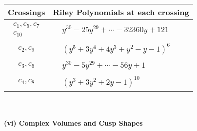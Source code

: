 \documentclass[1p]{elsarticle_modified}
\theoremstyle{definition}
\begin{document}
\begin{tabular}{m{50pt}|m{274pt}}
Crossings & \hspace{64pt}Riley Polynomials at each crossing \\
\hline $$\begin{aligned}c_{1},c_{5},c_{7}\\c_{10}\end{aligned}$$&$\begin{aligned}
&y^{30}-25 y^{29}+\cdots-32360 y+121
\end{aligned}$\\
\hline $$\begin{aligned}c_{2},c_{9}\end{aligned}$$&$\begin{aligned}
&(y^5+3 y^4+4 y^3+y^2- y-1)^6
\end{aligned}$\\
\hline $$\begin{aligned}c_{3},c_{6}\end{aligned}$$&$\begin{aligned}
&y^{30}-5 y^{29}+\cdots-56 y+1
\end{aligned}$\\
\hline $$\begin{aligned}c_{4},c_{8}\end{aligned}$$&$\begin{aligned}
&(y^3+3 y^2+2 y-1)^{10}
\end{aligned}$\\
\hline
\end{tabular}\\~\\
\newpage\flushleft \textbf{(vi) Complex Volumes and Cusp Shapes}
\end{document}
